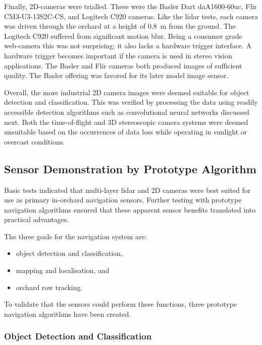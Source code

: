 \documentclass[preprint,authoryear,12pt]{elsarticle}
\begin{document}
        Finally, 2D-cameras were trialled.
        These were the Basler Dart daA1600-60uc, Flir CM3-U3-13S2C-CS, and Logitech C920 cameras.
        Like the lidar tests, each camera was driven through the orchard at a height of \SI{0.8}{\meter} from the ground.
        The Logitech C920 suffered from significant motion blur.
        Being a consumer grade web-camera this was not surprising; it also lacks a hardware trigger interface.
        A hardware trigger becomes important if the camera is used in stereo vision applications.
        The Basler and Flir cameras both produced images of sufficient quality.
        The Basler offering was favored for its later model image sensor.

        Overall, the more industrial 2D camera images were deemed suitable for object detection and classification.
        This was verified by processing the data using readily accessible detection algorithms such as convolutional neural networks discussed next.
        Both the time-of-flight and 3D stereoscopic camera systems were deemed unsuitable based on the occurrences of data loss while operating in sunlight or overcast conditions.

\subsection{Sensor Demonstration by Prototype Algorithm}

    Basic tests indicated that multi-layer lidar and 2D cameras were best suited for use as primary in-orchard navigation sensors.
    Further testing with prototype navigation algorithms ensured that these apparent sensor benefits translated into practical advantages.

    The three goals for the navigation system are:
    \begin{itemize}
        \item object detection and classification,
        \item mapping and localisation, and
        \item orchard row tracking.
    \end{itemize}
    To validate that the sensors could perform these functions, three prototype navigation algorithms have been created.

    \subsubsection{Object Detection and Classification}
\end{document}
